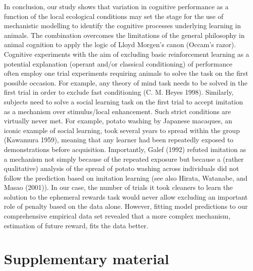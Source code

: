 \documentclass[
  12pt,
]{article}
\newcommand{\beginsupplement}{ \setcounter{table}{0}     \renewcommand{\thetable}{S\arabic{table}}\setcounter{figure}{0} \renewcommand{\thefigure}{S\arabic{figure}}}
\begin{document}
In conclusion, our study shows that variation in cognitive performance
as a function of the local ecological conditions may set the stage for
the use of mechanistic modelling to identify the cognitive processes
underlying learning in animals. The combination overcomes the
limitations of the general philosophy in animal cognition to apply the
logic of Lloyd Morgen's canon (Occam's razor). Cognitive experiments
with the aim of excluding basic reinforcement learning as a potential
explanation (operant and/or classical conditioning) of performance often
employ one trial experiments requiring animals to solve the task on the
first possible occasion. For example, any theory of mind task needs to
be solved in the first trial in order to exclude fast conditioning (C.
M. Heyes 1998). Similarly, subjects need to solve a social learning task
on the first trial to accept imitation as a mechanism over
stimulus/local enhancement. Such strict conditions are virtually never
met. For example, potato washing by Japanese macaques, an iconic example
of social learning, took several years to spread within the group
(Kawamura 1959), meaning that any learner had been repeatedly exposed to
demonstrations before acquisition. Importantly, Galef (1992) refuted
imitation as a mechanism not simply because of the repeated exposure but
because a (rather qualitative) analysis of the spread of potato washing
across individuals did not follow the prediction based on imitation
learning (see also Hirata, Watanabe, and Masao (2001)). In our case, the
number of trials it took cleaners to learn the solution to the ephemeral
rewards task would never allow excluding an important role of penalty
based on the data alone. However, fitting model predictions to our
comprehensive empirical data set revealed that a more complex mechanism,
estimation of future reward, fits the data better.

\newpage

\hypertarget{supplementary-material}{%
\section{Supplementary material}\label{supplementary-material}}

\beginsupplement
\end{document}
